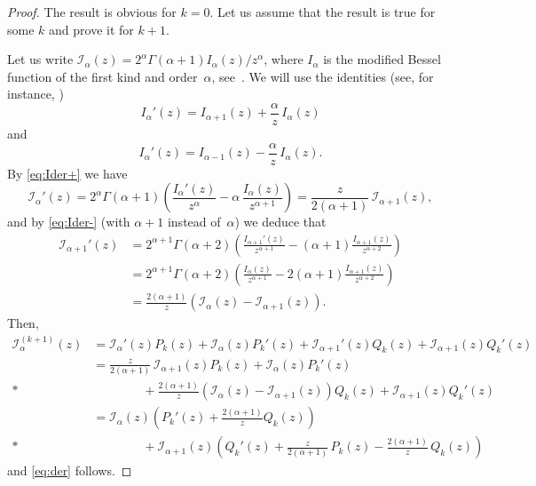 \documentclass[10pt,a4paper]{article}
\theoremstyle{plain}
\theoremstyle{definition}
\numberwithin{equation}{section} %
\newcommand{\I}{\mathcal{I}}
\begin{document}
\begin{proof}
The result is obvious for $k=0$. Let us assume that the result is true for some $k$ and prove it for $k+1$.

Let us write $\I_\alpha(z) = 2^\alpha \Gamma(\alpha+1){I_{\alpha}(z)}/{z^{\alpha}}$, where $I_\alpha$ is the modified Bessel function of the first kind and order~$\alpha$, see~\cite{Wat, Le, OlMa-NIST}. We will use the identities (see, for instance, \cite[formulas 10.29.2]{OlMa-NIST})
\begin{equation}
\label{eq:Ider+}
  I_\alpha'(z) = I_{\alpha+1}(z) + \frac{\alpha}{z}\,I_\alpha (z)
\end{equation}
and
\begin{equation}
\label{eq:Ider-}
  I_\alpha'(z) = I_{\alpha-1}(z) - \frac{\alpha}{z}\,I_\alpha (z).
\end{equation}
By \eqref{eq:Ider+} we have
\[
  \I_\alpha'(z) = 2^\alpha \Gamma(\alpha+1) \left(\frac{I_\alpha'(z)}{z^\alpha}
  - \alpha \, \frac{I_\alpha(z)}{z^{\alpha+1}}\right)
  = \frac{z}{2(\alpha+1)} \, \I_{\alpha+1}(z),
\]
and by \eqref{eq:Ider-} (with $\alpha+1$ instead of~$\alpha$) we deduce that
\begin{align*}
  \I_{\alpha+1}'(z) &= 2^{\alpha+1} \Gamma(\alpha+2) \left(\frac{I_{\alpha+1}'(z)}{z^{\alpha+1}}
  - (\alpha+1)\frac{I_{\alpha+1}(z)}{z^{\alpha+2}}\right) \\
  &= 2^{\alpha+1} \Gamma(\alpha+2) \left(\frac{I_{\alpha}(z)}{z^{\alpha+1}}
  - 2(\alpha+1)\frac{I_{\alpha+1}(z)}{z^{\alpha+2}}\right) \\
  &= \frac{2(\alpha+1)}{z}(\I_{\alpha}(z)-\I_{\alpha+1}(z)).
\end{align*}
Then,
\begin{align*}
  \I_{\alpha}^{(k+1)}(z) &= \I_\alpha'(z)P_k(z) + \I_\alpha(z)P_k'(z)
  + \I_{\alpha+1}'(z)Q_k(z) + \I_{\alpha+1}(z)Q_k'(z) \\
  &= \frac{z}{2(\alpha+1)} \, \I_{\alpha+1}(z)P_k(z)+\I_\alpha(z)P_k'(z) \\*
  &\qquad\qquad+ \frac{2(\alpha+1)}{z}(\I_{\alpha}(z) - \I_{\alpha+1}(z))Q_k(z)
  + \I_{\alpha+1}(z)Q_k'(z) \\
  &= \I_\alpha(z) \left(P_k'(z)+\frac{2(\alpha+1)}{z}Q_k(z)\right) \\*
  &\qquad\qquad+ \I_{\alpha+1}(z) \left(Q_k'(z) + \frac{z}{2(\alpha+1)}\,P_k(z) - \frac{2(\alpha+1)}{z}\,Q_k(z)\right)
\end{align*}
and \eqref{eq:der} follows.
\end{proof}
\end{document}
